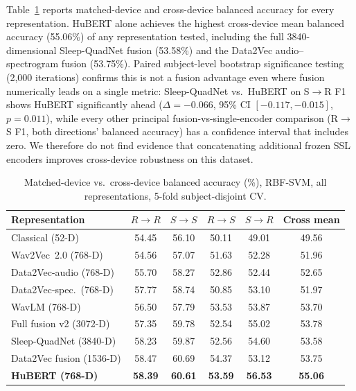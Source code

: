 \documentclass[conference]{IEEEtran}
\begin{document}
Table~\ref{tab:main_benchmark} reports matched-device and cross-device balanced accuracy for every representation. HuBERT alone achieves the highest cross-device mean balanced accuracy (55.06\%) of any representation tested, including the full 3840-dimensional Sleep-QuadNet fusion (53.58\%) and the Data2Vec audio--spectrogram fusion (53.75\%). Paired subject-level bootstrap significance testing (2,000 iterations) confirms this is not a fusion advantage even where fusion numerically leads on a single metric: Sleep-QuadNet vs.\ HuBERT on S$\rightarrow$R F1 shows HuBERT significantly ahead ($\Delta=-0.066$, 95\% CI $[-0.117,-0.015]$, $p=0.011$), while every other principal fusion-vs-single-encoder comparison (R$\rightarrow$S F1, both directions' balanced accuracy) has a confidence interval that includes zero. We therefore do not find evidence that concatenating additional frozen SSL encoders improves cross-device robustness on this dataset.

\begin{table}[!t]
\centering
\caption{Matched-device vs.\ cross-device balanced accuracy (\%), RBF-SVM, all representations, 5-fold subject-disjoint CV.}
\label{tab:main_benchmark}
\scriptsize
\begin{tabular}{lccccc}
\toprule
\textbf{Representation} & \textbf{$R\!\to\!R$} & \textbf{$S\!\to\!S$} & \textbf{$R\!\to\!S$} & \textbf{$S\!\to\!R$} & \textbf{Cross mean} \\
\midrule
Classical (52-D)       & 54.45 & 56.10 & 50.11 & 49.01 & 49.56 \\
Wav2Vec~2.0 (768-D)    & 54.56 & 57.07 & 51.63 & 52.28 & 51.96 \\
Data2Vec-audio (768-D) & 55.70 & 58.27 & 52.86 & 52.44 & 52.65 \\
Data2Vec-spec.\ (768-D)& 57.77 & 58.74 & 50.85 & 53.10 & 51.97 \\
WavLM (768-D)          & 56.50 & 57.79 & 53.53 & 53.87 & 53.70 \\
Full fusion v2 (3072-D)& 57.35 & 59.78 & 52.54 & 55.02 & 53.78 \\
Sleep-QuadNet (3840-D) & 58.23 & 59.87 & 52.56 & 54.60 & 53.58 \\
Data2Vec fusion (1536-D)& 58.47 & 60.69 & 54.37 & 53.12 & 53.75 \\
\textbf{HuBERT (768-D)}& \textbf{58.39} & \textbf{60.61} & \textbf{53.59} & \textbf{56.53} & \textbf{55.06} \\
\bottomrule
\end{tabular}
\end{table}
\end{document}
